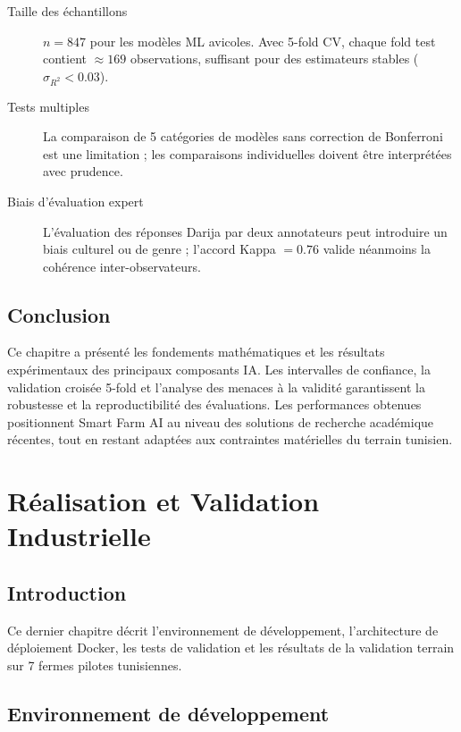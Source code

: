 \begin{description}
  \item[Taille des échantillons] $n = 847$ pour les modèles ML avicoles.
        Avec 5-fold CV, chaque fold test contient $\approx 169$ observations,
        suffisant pour des estimateurs stables ($\sigma_{R^2} < 0.03$).
  \item[Tests multiples] La comparaison de 5 catégories de modèles sans
        correction de Bonferroni est une limitation ; les comparaisons
        individuelles doivent être interprétées avec prudence.
  \item[Biais d'évaluation expert] L'évaluation des réponses Darija par
        deux annotateurs peut introduire un biais culturel ou de genre ;
        l'accord Kappa $= 0.76$ valide néanmoins la cohérence inter-observateurs.
\end{description}

\section*{Conclusion}
Ce chapitre a présenté les fondements mathématiques et les résultats
expérimentaux des principaux composants IA. Les intervalles de confiance,
la validation croisée 5-fold et l'analyse des menaces à la validité
garantissent la robustesse et la reproductibilité des évaluations. Les
performances obtenues positionnent Smart Farm AI au niveau des solutions
de recherche académique récentes, tout en restant adaptées aux contraintes
matérielles du terrain tunisien.

\chapter{Réalisation et Validation Industrielle}
\section*{Introduction}
Ce dernier chapitre décrit l'environnement de développement, l'architecture
de déploiement Docker, les tests de validation et les résultats de la
validation terrain sur 7 fermes pilotes tunisiennes.

\section{Environnement de développement}

